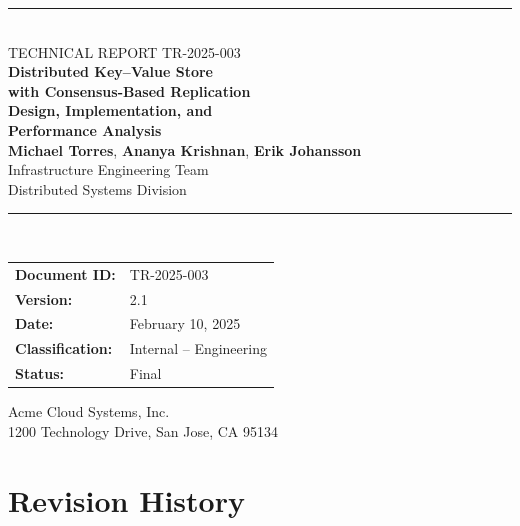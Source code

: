 \documentclass[12pt,a4paper]{report}
\begin{document}
\begin{titlepage}
\centering
\vspace*{1cm}

{\color{headerblue}\rule{\textwidth}{2pt}}\\[1cm]

{\small\color{codegray} TECHNICAL REPORT TR-2025-003}\\[1cm]
{\fontsize{28}{34}\selectfont\bfseries\color{headerblue}
  Distributed Key--Value Store\\with Consensus-Based Replication\\[0.3cm]
  Design, Implementation, and\\Performance Analysis}\\[1.5cm]

{\Large
  \textbf{Michael Torres}, \textbf{Ananya Krishnan}, \textbf{Erik Johansson}}\\[0.5cm]
{\large Infrastructure Engineering Team\\Distributed Systems Division}\\[1.5cm]

{\color{headerblue}\rule{0.6\textwidth}{0.5pt}}\\[1cm]

{\large
\begin{tabular}{ll}
\textbf{Document ID:} & TR-2025-003 \\
\textbf{Version:} & 2.1 \\
\textbf{Date:} & February 10, 2025 \\
\textbf{Classification:} & Internal -- Engineering \\
\textbf{Status:} & Final \\
\end{tabular}}

\vfill

{\large Acme Cloud Systems, Inc.\\
1200 Technology Drive, San Jose, CA 95134}

\end{titlepage}

\chapter*{Revision History}
\end{document}
